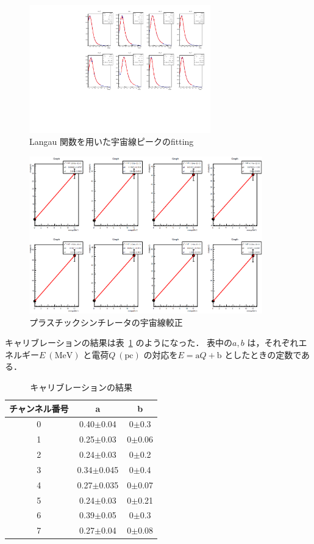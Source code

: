 \begin{figure}[H]
  \centering
  \includegraphics[width=0.7\textwidth,angle=-90]{figure/tajima/fit_langau.pdf}
  \caption{Langau 関数を用いた宇宙線ピークのfitting}\label{ps_langau}
\end{figure} 
\begin{figure}[H]
  \centering
  \includegraphics[width=0.9\textwidth]{figure/tajima/fit_calibline.png}
  \caption{プラスチックシンチレータの宇宙線較正}\label{ps_cali}
\end{figure}

 キャリブレーションの結果は表~\ref{PS_calib_table} のようになった．
 表中の$a ,b$ は，それぞれエネルギー$E~(\mathrm{MeV })$ と電荷$Q~(\mathrm{pc })$ の対応を$E = \mathrm{a} Q + \mathrm{b}$ としたときの定数である．
 \begin{table}[h]
  \caption{キャリブレーションの結果}
  \label{PS_calib_table}
  \begin{center}
   \begin{tabular}{ccc}\toprule
    チャンネル番号&a &b \\ \hline
    0& 0.40$\pm$0.04 &0$\pm$0.3 \\
    1& 0.25$\pm$0.03 &0$\pm$0.06 \\
    2& 0.24$\pm$0.03 &0$\pm$0.2 \\
    3& 0.34$\pm$0.045 &0$\pm$0.4 \\
    4& 0.27$\pm$0.035 &0$\pm$0.07 \\
    5& 0.24$\pm$0.03 &0$\pm$0.21 \\
    6& 0.39$\pm$0.05 &0$\pm$0.3 \\
    7& 0.27$\pm$0.04 &0$\pm$0.08 \\ \bottomrule
   \end{tabular}
  \end{center}
 \end{table}%


